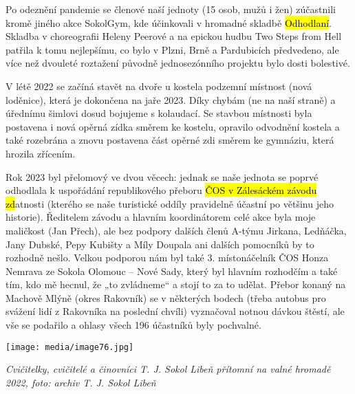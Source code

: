 Po odeznění pandemie se členové naší jednoty (15 osob, mužů i žen)
zúčastnili kromě jiného akce SokolGym, kde účinkovali v hromadné skladbě
\hl{Odhodlaní}. Skladba v choreografii Heleny Peerové a na epickou hudbu
Two Steps from Hell patřila k tomu nejlepšímu, co bylo v Plzni, Brně a
Pardubicích předvedeno, ale více než dvouleté roztažení původně
jednosezónního projektu bylo dosti bolestivé.

V létě 2022 se začíná stavět na dvoře u kostela podzemní místnost (nová
loděnice), která je dokončena na jaře 2023. Díky chybám (ne na naší
straně) a úřednímu šimlovi dosud bojujeme s kolaudací. Se stavbou
místnosti byla postavena i nová opěrná zídka směrem ke kostelu, opravilo
odvodnění kostela a také rozebrána a znovu postavena část opěrné zdi
směrem ke gymnáziu, která hrozila zřícením.

Rok 2023 byl přelomový ve dvou věcech: jednak se naše jednota se poprvé
odhodlala k uspořádání republikového přeboru \hl{ČOS v Zálesáckém závodu
zd}atnosti (kterého se naše turistické oddíly pravidelně účastní po
většinu jeho historie). Ředitelem závodu a hlavním koordinátorem celé
akce byla moje maličkost (Jan Přech), ale bez podpory dalších členů
A-týmu Jirkana, Ledňáčka, Jany Dubské, Pepy Kubišty a Míly Doupala ani
dalších pomocníků by to rozhodně nešlo. Velkou podporou nám byl také 3.
místonáčelník ČOS Honza Nemrava ze Sokola Olomouc -- Nové Sady, který
byl hlavním rozhodčím a také tím, kdo mě hecnul, že „to zvládneme`` a
stojí to za to udělat. Přebor konaný na Machově Mlýně (okres Rakovník)
se v některých bodech (třeba autobus pro svážení lidí z Rakovníka na
poslední chvíli) vyznačoval notnou dávkou štěstí, ale vše se podařilo a
ohlasy všech 196 účastníků byly pochvalné.

\texttt{[image: media/image76.jpg]}

\emph{Cvičitelky, cvičitelé a činovníci T. J. Sokol Libeň přítomní na
valné hromadě 2022, foto: archiv T. J. Sokol Libeň}

